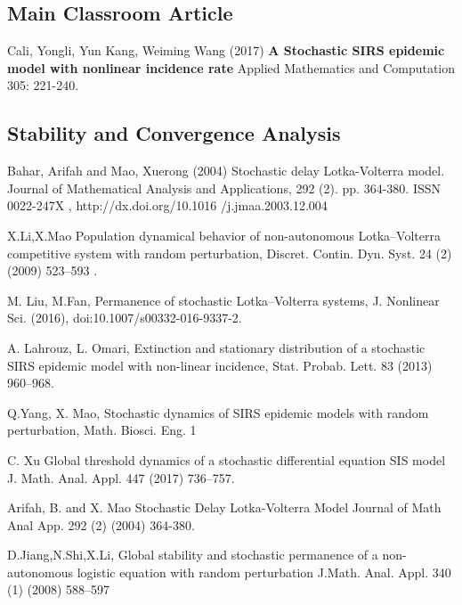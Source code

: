 
\begin{thebibliography}{00}

\subsection{Main Classroom Article}

Cali, Yongli, Yun Kang, Weiming Wang (2017)
\newblock \textbf{A Stochastic SIRS epidemic model with nonlinear incidence rate}
\newblock Applied Mathematics and Computation 305: 221-240.


\subsection{Stability and Convergence Analysis}

Bahar, Arifah and Mao, Xuerong (2004) 
\newblock Stochastic delay Lotka-Volterra model. 
\newblock Journal of Mathematical Analysis and Applications, 292 (2). pp. 364-380. ISSN 0022-247X , http://dx.doi.org/10.1016
/j.jmaa.2003.12.004

 X.Li,X.Mao
\newblock Population dynamical behavior of non-autonomous Lotka–Volterra competitive system with random perturbation, 
\newblock Discret. Contin. Dyn. Syst. 24 (2) (2009) 523–593 .

 M. Liu, M.Fan, 
\newblock Permanence of stochastic Lotka–Volterra systems,
\newblock J. Nonlinear Sci. (2016), doi:10.1007/s00332-016-9337-2.

 A. Lahrouz, L. Omari,
\newblock Extinction and stationary distribution of a stochastic SIRS epidemic model with non-linear incidence,
\newblock Stat. Probab. Lett. 83 (2013) 960–968.

 Q.Yang, X. Mao,
\newblock Stochastic dynamics of SIRS epidemic models with random perturbation,
\newblock Math. Biosci. Eng. 1

 C. Xu
\newblock Global threshold dynamics of a stochastic differential equation SIS model
\newblock J. Math. Anal. Appl. 447 (2017) 736–757.

Arifah, B. and X. Mao 
\newblock Stochastic Delay Lotka-Volterra Model 
\newblock Journal of Math Anal App. 292 (2) (2004) 364-380.

 D.Jiang,N.Shi,X.Li,
\newblock Global stability and stochastic permanence of a non-autonomous logistic equation with random perturbation
\newblock J.Math. Anal. Appl. 340 (1) (2008) 588–597


\end{thebibliography}
